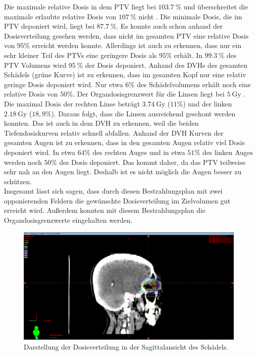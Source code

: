 Die maximale relative Dosis in dem PTV liegt bei $\SI{103.7}{\percent}$ und überschreitet die maximale erlaubte relative Dosis von $\SI{107}{\percent}$
nicht \cite{ICRU}.
Die minimale Dosis, die im PTV deponiert wird, liegt bei $\SI{87.7}{\percent}$. Es konnte auch schon anhand der Dosisverteilung gesehen werden, dass
nicht im gesamten PTV eine relative Dosis von $95\%$ erreicht werden konnte. Allerdings ist auch zu erkennen, dass nur ein
sehr kleiner Teil des PTVs eine geringere Dosis als $95\%$ erhält.
In $\SI{99,3}{\percent}$ des
PTV Volumens wird $\SI{95}{\percent}$ der Dosis deponiert. Anhand des DVHs des gesamten Schädels (grüne Kurve) ist zu erkennen,
dass im gesamten Kopf nur eine relativ geringe Dosis deponiert wird. Nur etwa $6\%$ des Schädelvolumens erhält noch eine relative Dosis von
$50\%$.
Der Organdosisgrenzwert für die Linsen liegt bei $\SI{5}{\gray}$ \cite{grenz}. Die maximal Dosis der rechten Linse beträgt $\SI{3,74}{\gray}$ ($11\%$) und
der linken $\SI{2,18}{\gray}$ ($18,9\%$).
Daraus folgt, dass die Linsen ausreichend geschont werden konnten. Das ist auch in dem DVH zu erkennen,
weil die beiden Tiefendosiskurven relativ schnell abfallen.
Anhand der DVH Kurven der gesamten Augen ist zu erkennen, dass in den gesamten Augen relativ viel Dosis deponiert wird.
In etwa $64\%$ des rechten Auges und in etwa $51\%$ des linken Auges werden noch $50\%$ des Dosis deponiert. Das kommt daher, da
das PTV teilweise sehr nah an den Augen liegt. Deshalb ist es nicht möglich die Augen besser zu schützen. \\

Insgesamt lässt sich sagen, dass durch diesen Bestrahlungsplan mit zwei opponierenden Feldern die gewünschte Dosisverteilung im Zielvolumen
gut erreicht wird. Außerdem konnten mit diesem Bestrahlungsplan die Organdosisgrenzwerte eingehalten werden.

\begin{figure}[h]
	\centering
	\includegraphics[width=\linewidth]{Bilder/EO_X_mitPTV}
	\caption{Darstellung der Dosisverteilung in der Sagittalansicht des Schädels.}
	\label{fig:eoxmitptv}
\end{figure}


